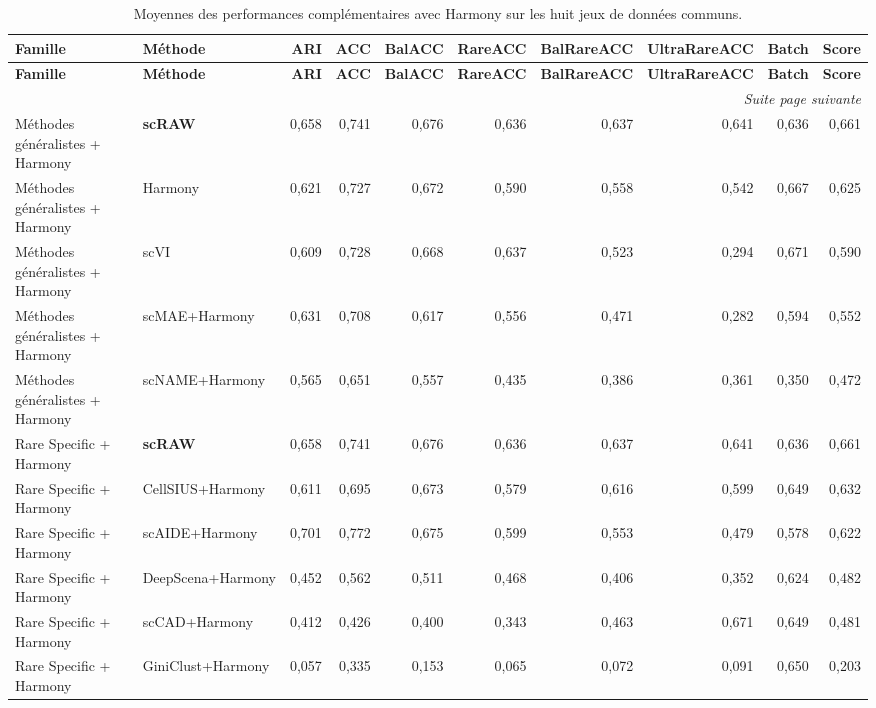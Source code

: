 {\scriptsize
\setlength{\tabcolsep}{3pt}
\renewcommand{\arraystretch}{1.12}
\begin{longtable}{p{}p{}rrrrrrrr}
\caption{Moyennes des performances complémentaires avec Harmony sur les huit jeux de données communs.}\label{tab:common8_harmony_complement_means}\\
\toprule
\textbf{Famille} & \textbf{Méthode} & \textbf{ARI} & \textbf{ACC} & \textbf{BalACC} & \textbf{RareACC} & \textbf{BalRareACC} & \textbf{UltraRareACC} & \textbf{Batch} & \textbf{Score} \\
\midrule
\endfirsthead
\toprule
\textbf{Famille} & \textbf{Méthode} & \textbf{ARI} & \textbf{ACC} & \textbf{BalACC} & \textbf{RareACC} & \textbf{BalRareACC} & \textbf{UltraRareACC} & \textbf{Batch} & \textbf{Score} \\
\midrule
\endhead
\midrule
\multicolumn{10}{r}{\textit{Suite page suivante}}\\
\endfoot
\bottomrule
\endlastfoot
Méthodes généralistes + Harmony & \textbf{scRAW} & 0,658 & 0,741 & 0,676 & 0,636 & 0,637 & 0,641 & 0,636 & 0,661 \\
Méthodes généralistes + Harmony & Harmony & 0,621 & 0,727 & 0,672 & 0,590 & 0,558 & 0,542 & 0,667 & 0,625 \\
Méthodes généralistes + Harmony & scVI & 0,609 & 0,728 & 0,668 & 0,637 & 0,523 & 0,294 & 0,671 & 0,590 \\
Méthodes généralistes + Harmony & scMAE+Harmony & 0,631 & 0,708 & 0,617 & 0,556 & 0,471 & 0,282 & 0,594 & 0,552 \\
Méthodes généralistes + Harmony & scNAME+Harmony & 0,565 & 0,651 & 0,557 & 0,435 & 0,386 & 0,361 & 0,350 & 0,472 \\
Rare Specific + Harmony & \textbf{scRAW} & 0,658 & 0,741 & 0,676 & 0,636 & 0,637 & 0,641 & 0,636 & 0,661 \\
Rare Specific + Harmony & CellSIUS+Harmony & 0,611 & 0,695 & 0,673 & 0,579 & 0,616 & 0,599 & 0,649 & 0,632 \\
Rare Specific + Harmony & scAIDE+Harmony & 0,701 & 0,772 & 0,675 & 0,599 & 0,553 & 0,479 & 0,578 & 0,622 \\
Rare Specific + Harmony & DeepScena+Harmony & 0,452 & 0,562 & 0,511 & 0,468 & 0,406 & 0,352 & 0,624 & 0,482 \\
Rare Specific + Harmony & scCAD+Harmony & 0,412 & 0,426 & 0,400 & 0,343 & 0,463 & 0,671 & 0,649 & 0,481 \\
Rare Specific + Harmony & GiniClust+Harmony & 0,057 & 0,335 & 0,153 & 0,065 & 0,072 & 0,091 & 0,650 & 0,203 \\
\end{longtable}
}
